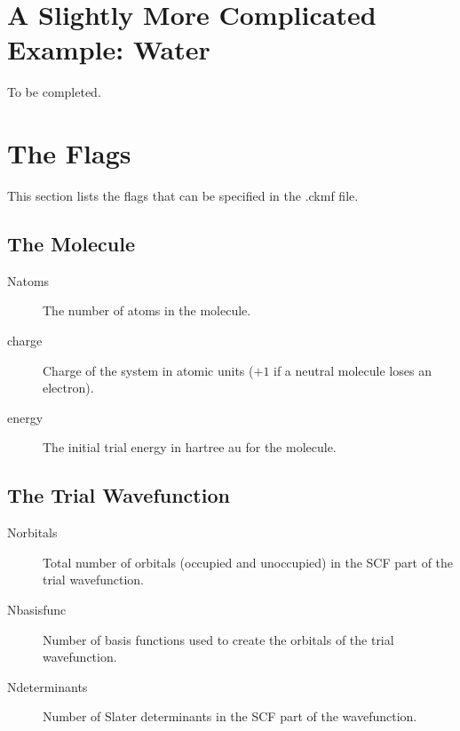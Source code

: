 \documentclass[11pt]{article}
\begin{document}
\section{A Slightly More Complicated Example: Water}
To be completed.

%

\section{The Flags}
This section lists the flags that can be specified in the .ckmf file.

\subsection{The Molecule}

\begin{description}
\item [Natoms] The number of atoms in the molecule.
\item [charge] Charge of the system in atomic units ($+1$ if a neutral
  molecule loses an electron).
\item [energy] The initial trial energy in hartree au for the molecule.
\end{description}

\subsection{The Trial Wavefunction}

\begin{description}

\item [Norbitals] Total number of orbitals (occupied and unoccupied) in
  the SCF part of the trial wavefunction.

\item [Nbasisfunc] Number of basis functions used to create the
  orbitals of the trial wavefunction. 

\item [Ndeterminants] Number of Slater determinants in the SCF part of
  the wavefunction.

\end{description}
\end{document}

